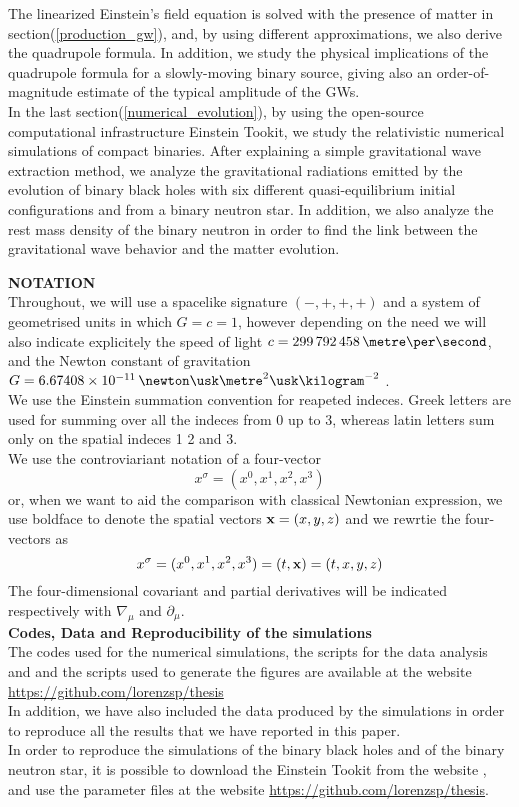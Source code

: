 The linearized Einstein's field equation is solved with the presence of matter in section(\ref{production_gw}), and, by using different approximations, we also derive the quadrupole formula. 
In addition, we study the physical implications of the quadrupole formula for a slowly-moving binary source, giving also an order-of-magnitude estimate of the typical amplitude of the GWs.\\
In the last section(\ref{numerical_evolution}), by using the open-source computational infrastructure Einstein Tookit\cite{loffler_einstein_2012}, we study the relativistic numerical simulations of compact binaries.
After explaining a simple gravitational wave extraction method, we analyze the gravitational radiations emitted by the evolution of binary black holes with six different quasi-equilibrium initial configurations and from a binary neutron star.
In addition, we also analyze the rest mass density of the binary neutron in order to find the link between the gravitational wave behavior and the matter evolution.

\textbf{NOTATION}\\
Throughout, we will use a spacelike signature $(-,+,+,+)$ and a system of geometrised units in which $G=c=1$, however depending on the need we will also indicate explicitely the speed of light $c=299\,792\,458 \,\metre \per \second$, and the Newton constant of gravitation $G=6.67408 \times 10^{-11} \, \newton \usk \metre^2 \usk \kilogram^{-2}$ \cite{codata_blog_codata_nodate}.\\
We use the Einstein summation convention for  reapeted indeces.
Greek letters are used for summing over all the indeces from 0 up to 3,
whereas latin letters sum only on the spatial indeces 1 2 and 3.\\
We use the controviariant notation of a four-vector
\[
x^{\sigma} = (x^{0},x^{1}, x^{2},x^{3})
\]
or, when we want to aid the comparison with classical Newtonian expression, we use boldface to denote the spatial vectors $\vb{x} =(x,y,z)$ and we rewrtie the four-vectors as 
\[
x^{\sigma} = (x^{0},x^{1}, x^{2},x^{3}) = (t,\vb{x}) = (t,x,y,z)
\]
The four-dimensional covariant and partial derivatives will be indicated respectively with $\nabla _{\mu}$ and $\partial _\mu$.\\

\textbf{Codes, Data and Reproducibility of the simulations}\\
The codes used for the numerical simulations, the scripts for the data analysis and and the scripts used to generate the figures are available at the website
\\
\url{https://github.com/lorenzsp/thesis}
\\
In addition, we have also included the data produced by the simulations in order to reproduce all the results that we have reported in this paper. \\
In order to reproduce the simulations of the binary black holes and of the binary neutron star, it is possible to download the Einstein Tookit from the website \cite{EinsteinToolkit:web}, and use the parameter files at the website \url{https://github.com/lorenzsp/thesis}.